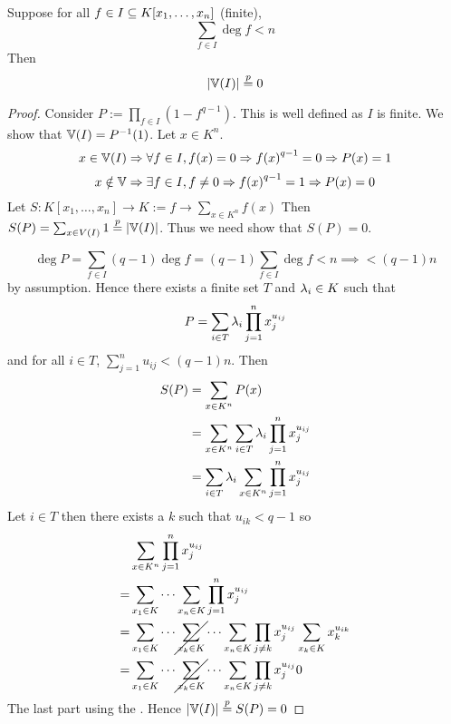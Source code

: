 \begin{prop}[Chevalley]
    Suppose for all $f \in I \subseteq K[x_1, \dots , x_n]$ (finite), 
    \[\sum_{f \in I} \deg f < n\]
    Then 
    \[\abs{\V(I)} \ontop{p}{=} 0\]
\end{prop}
\begin{proof}
    Consider $P := \prod_{f \in I} (1 - f^{q-1})$.
    This is well defined as $I$ is finite.
    We show that $\mathbb{V}(I) = P^{-1} (1)$.
    Let $x \in K^n$.
    \[
        x \in \mathbb{V}(I) \Rightarrow \forall f \in I, f(x) = 0 
        \Rightarrow  {f(x)}^{q - 1} = 0 
        \Rightarrow P(x) = 1
    \]
    \[
        x \notin \mathbb{V} \Rightarrow
        \exists f \in I, f \ne 0
        \Rightarrow {f(x)}^{q - 1} = 1
        \Rightarrow P(x) = 0
    \]
    Let 
    $S : K[x_1 ,\dots, x_n] \to K := f \to \sum_{x \in K^n} f(x)$
    Then $S(P) = \sum_{x \in V(I)} 1 \ontop{p}{=} \abs{\V(I)}$.
    Thus we need show that $S(P) = 0$.

    \[\deg P = \sum_{f \in I} (q - 1)\deg f 
    = (q - 1) \sum_{f \in I} \deg f < n \implies < (q - 1) n\]
    by assumption.
    Hence there exists a finite set $T$ and $\lambda_i \in K$ such that
    \[P = \sum_{i \in T} \lambda_i \prod_{j = 1}^n x_j^{u_{ij}}\]
    and for all $i \in T$, $\sum_{j = 1}^n u_{ij} < (q - 1) n$.
    Then 
    \begin{align}
        S(P) &= \sum_{x \in K^n} P(x)\\
            &= \sum_{x\in K^n} \sum_{i \in T} \lambda_i 
            \prod_{j = 1}^n x_j^{u_{ij}}\\
            &= \sum_{i \in T} \lambda_i \sum_{x\in K^n} 
            \prod_{j = 1}^n x_j^{u_{ij}}\\
    \end{align}
    Let $i \in T$ then there exists a $k$ such that 
    $u_{ik} < q - 1$ so
    \begin{align}
        & \sum_{x\in K^n} \prod_{j = 1}^n x_j^{u_{ij}}\\
        = & \sum_{x_1 \in K} \cdots \sum_{x_n \in K} 
        \prod_{j = 1}^n x_j^{u_{ij}}\\
        = & \sum_{x_1 \in K} \cdots \cancel{\sum_{x_k \in K}} \cdots \sum_{x_n \in K} 
        \prod_{j \ne k} x_j^{u_{ij}} \sum_{x_k \in K} x_k^{u_{ik}}\\
        = & \sum_{x_1 \in K} \cdots \cancel{\sum_{x_k \in K}} \cdots \sum_{x_n \in K} 
        \prod_{j \ne k} x_j^{u_{ij}} 0
    \end{align}
    The last part using the .
    Hence $\abs{\V(I)} \ontop{p}{=} S(P) = 0$
\end{proof}

